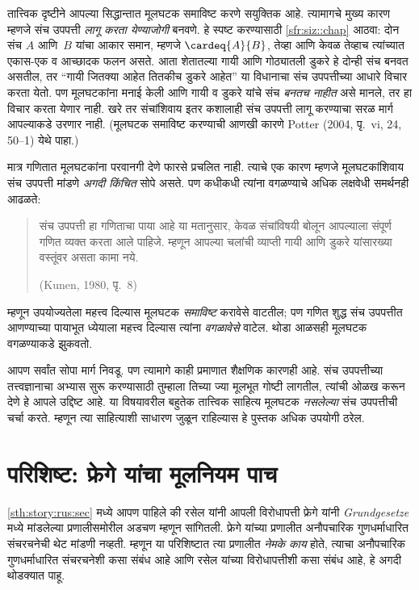 तात्त्विक दृष्टीने आपल्या सिद्धान्तात मूलघटक समाविष्ट करणे सयुक्तिक आहे. त्यामागचे मुख्य कारण म्हणजे संच उपपत्ती \emph{लागू करता येण्याजोगी} बनवणे. हे स्पष्ट करण्यासाठी \ref{sfr:siz::chap} आठवा: दोन संच $A$ आणि~$B$ यांचा आकार समान, म्हणजे $\cardeq{A}{B}$, तेव्हा आणि केवळ तेव्हाच त्यांच्यात एकास-एक व आच्छादक फलन असते. आता शेतातल्या गायी आणि गोठ्यातली डुकरे हे दोन्ही संच बनवत असतील, तर ``गायी जितक्या आहेत तितकीच डुकरे आहेत'' या विधानाचा संच उपपत्तीच्या आधारे विचार करता येतो. पण मूलघटकांना मनाई केली आणि गायी व डुकरे यांचे संच \emph{बनतच नाहीत} असे मानले, तर हा विचार करता येणार नाही. खरे तर संचांशिवाय इतर कशालाही संच उपपत्ती लागू करण्याचा सरळ मार्ग आपल्याकडे उरणार नाही. (मूलघटक समाविष्ट करण्याची आणखी कारणे Potter (2004, पृ.~vi, 24, 50--1) येथे पाहा.)

मात्र गणितात मूलघटकांना परवानगी देणे फारसे प्रचलित नाही. त्याचे एक कारण म्हणजे मूलघटकांशिवाय संच उपपत्ती मांडणे \emph{अगदी किंचित} सोपे असते. पण कधीकधी त्यांना वगळण्याचे अधिक लक्षवेधी समर्थनही आढळते:
\begin{quote}
  संच उपपत्ती हा गणिताचा पाया आहे या मतानुसार, केवळ संचांविषयी बोलून आपल्याला संपूर्ण गणित व्यक्त करता आले पाहिजे. म्हणून आपल्या चलांची व्याप्ती गायी आणि डुकरे यांसारख्या वस्तूंवर असता कामा नये.

  (Kunen, 1980, पृ.~8)
\end{quote}
म्हणून उपयोज्यतेला महत्त्व दिल्यास मूलघटक \emph{समाविष्ट} करावेसे वाटतील; पण गणित शुद्ध संच उपपत्तीत आणण्याच्या पायाभूत ध्येयाला महत्त्व दिल्यास त्यांना \emph{वगळावेसे} वाटेल. थोडा आळसही मूलघटक वगळण्याकडे झुकवतो.

आपण सर्वांत सोपा मार्ग निवडू. पण त्यामागे काही प्रमाणात शैक्षणिक कारणही आहे. संच उपपत्तीच्या तत्त्वज्ञानाचा अभ्यास सुरू करण्यासाठी तुम्हाला तिच्या ज्या मूलभूत गोष्टी लागतील, त्यांची ओळख करून देणे हे आपले उद्दिष्ट आहे. या विषयावरील बहुतेक तात्त्विक साहित्य मूलघटक \emph{नसलेल्या} संच उपपत्तीची चर्चा करते. म्हणून त्या साहित्याशी साधारण जुळून राहिल्यास हे पुस्तक अधिक उपयोगी ठरेल.









\section{परिशिष्ट: फ्रेगे यांचा मूलनियम पाच}\label{sth:story:blv:sec}

\ref{sth:story:rus:sec} मध्ये आपण पाहिले की रसेल यांनी आपली विरोधापत्ती फ्रेगे यांनी \emph{Grundgesetze} मध्ये मांडलेल्या प्रणालीसमोरील अडचण म्हणून सांगितली. फ्रेगे यांच्या प्रणालीत अनौपचारिक गुणधर्माधारित संचरचनेची थेट मांडणी नव्हती. म्हणून या परिशिष्टात त्या प्रणालीत \emph{नेमके काय} होते, त्याचा अनौपचारिक गुणधर्माधारित संचरचनेशी कसा संबंध आहे आणि रसेल यांच्या विरोधापत्तीशी कसा संबंध आहे, हे अगदी थोडक्यात पाहू.

